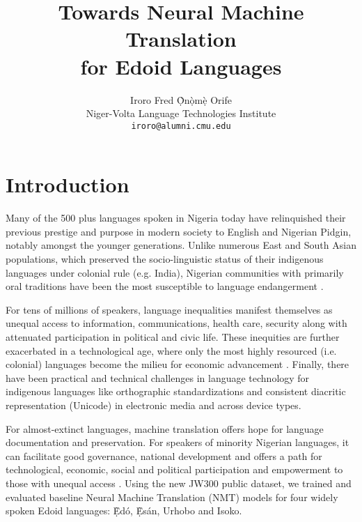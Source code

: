 \documentclass{article} %
\title{Towards Neural Machine Translation \\ for Edoid Languages}
\author{Iroro Fred \d{\`O}n\d{\`o}m\d{\`e} Orife \\
Niger-Volta Language Technologies Institute\\
\texttt{iroro@alumni.cmu.edu} \\
}
\begin{document}
\maketitle



\section{Introduction}

Many of the 500 plus languages spoken in Nigeria today have relinquished their previous prestige and purpose in modern society to English and Nigerian Pidgin, notably amongst the younger generations. Unlike numerous East and South Asian populations, which preserved the socio-linguistic status of their indigenous languages under colonial rule (e.g. India), Nigerian communities with primarily oral traditions have been the most susceptible to language endangerment \citep{rolle2013phonetics, omo2004esan}.

For tens of millions of speakers, language inequalities manifest themselves as unequal access to information, communications, health care, security along with attenuated participation in political and civic life. These inequities are further exacerbated in a technological age, where only the most highly resourced (i.e. colonial) languages become the milieu for economic advancement \citep{odojelanguage, awobuluyi201626, ganagana2019contrastive}. Finally, there have been practical and technical challenges in language technology for indigenous languages like orthographic standardizations and consistent diacritic representation (Unicode) in electronic media and across device types. 

For almost-extinct languages, machine translation offers hope for language documentation and preservation. For speakers of minority Nigerian languages, it can facilitate good governance, national development and offers a path for technological, economic, social and political participation and empowerment to those with unequal access \citep{odoje201612, odojelanguage}. Using the new JW300 public dataset, we trained and evaluated baseline Neural Machine Translation (NMT) models for four widely spoken Edoid languages: \d{\`E}d{\'o}, \d{\`E}s{\'a}n, Urhobo and Isoko. 
\end{document}
